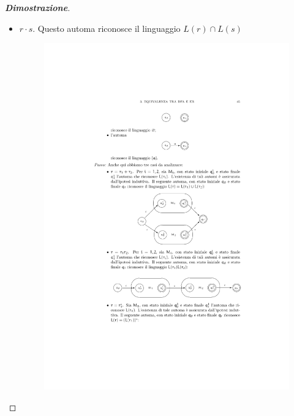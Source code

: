 \documentclass[a4paper]{article}
\begin{document}
\begin{proof}[\textbf{Dimostrazione}]
\begin{itemize}
			\item $r \cdot s$. Questo automa riconosce il linguaggio $L\left(r\right) \cap L\left(s\right)$
				\begin{figure}[!htp]
					\centering
					\includegraphics[width=1\textwidth]{img/teorema_McN-Yamada5.pdf}
				\end{figure}
			

\end{itemize}
\end{proof}
\end{document}
